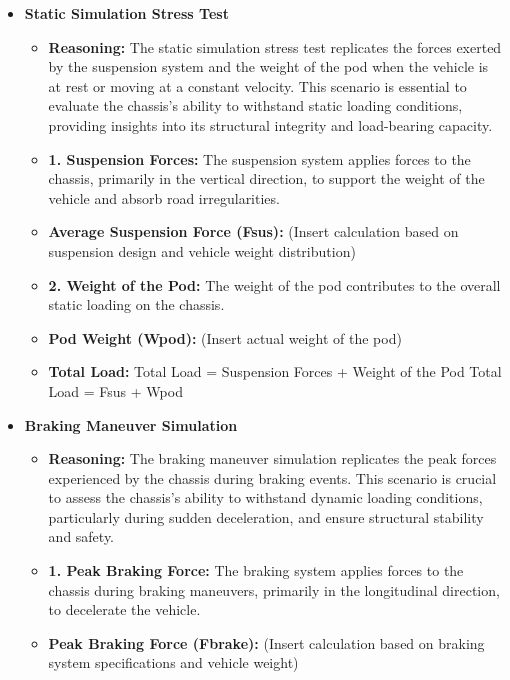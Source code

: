\begin{itemize}
  \item \textbf{Static Simulation Stress Test}
    \begin{itemize}
      \item \textbf{Reasoning:} The static simulation stress test replicates the forces exerted by the 		suspension system and the weight of the pod when the vehicle is at rest or moving at a 					constant velocity. This scenario is essential to evaluate the chassis's ability to withstand 				static loading conditions, providing insights into its structural integrity and load-bearing 				capacity.

	  \item \textbf{1.	Suspension Forces:} 
		The suspension system applies forces to the chassis, primarily in the vertical direction, to 				support the weight of the vehicle and absorb road irregularities.

	  \item \textbf{Average Suspension Force (Fsus):}
		(Insert calculation based on suspension design and vehicle weight distribution)

	  \item \textbf{2.	Weight of the Pod:} 
		The weight of the pod contributes to the overall static loading on the chassis.

	  \item \textbf{Pod Weight (Wpod):} 
		(Insert actual weight of the pod)

	  \item \textbf{Total Load:}
		Total Load = Suspension Forces + Weight of the Pod Total Load = Fsus + Wpod
	\end{itemize}
\end{itemize}

\begin{itemize}
  \item \textbf{Braking Maneuver Simulation}
    \begin{itemize}
      \item \textbf{Reasoning:} The braking maneuver simulation replicates the peak forces experienced 		by the chassis during braking events. This scenario is crucial to assess the chassis's ability 		to withstand dynamic loading conditions, particularly during sudden deceleration, and ensure 				structural stability and safety.

	  \item \textbf{1.	Peak Braking Force:} 
		The braking system applies forces to the chassis during braking maneuvers, primarily in the 				longitudinal direction, to decelerate the vehicle.

	  \item \textbf{Peak Braking Force (Fbrake):}
		(Insert calculation based on braking system specifications and vehicle weight)
	\end{itemize}
\end{itemize}
	
